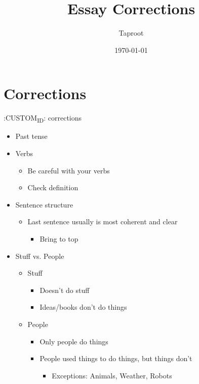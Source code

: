 \documentclass[letterpaper]{article}
\author{Taproot}
\date{\today}
\title{Essay Corrections}
\renewcommand\maketitle{}
\begin{document}
\maketitle

\section{Corrections}
\label{sec:org97fd6dd}
:CUSTOM\textsubscript{ID}: corrections

\begin{itemize}
\item Past tense
\item Verbs

\begin{itemize}
\item Be careful with your verbs
\item Check definition
\end{itemize}

\item Sentence structure

\begin{itemize}
\item Last sentence usually is most coherent and clear

\begin{itemize}
\item Bring to top
\end{itemize}
\end{itemize}

\item Stuff vs. People

\begin{itemize}
\item Stuff

\begin{itemize}
\item Doesn't do stuff
\item Ideas/books don't do things
\end{itemize}

\item People

\begin{itemize}
\item Only people do things
\item People used things to do things, but things don't

\begin{itemize}
\item Exceptions: Animals, Weather, Robots
\end{itemize}
\end{itemize}


\end{itemize}
\end{itemize}
\end{document}
